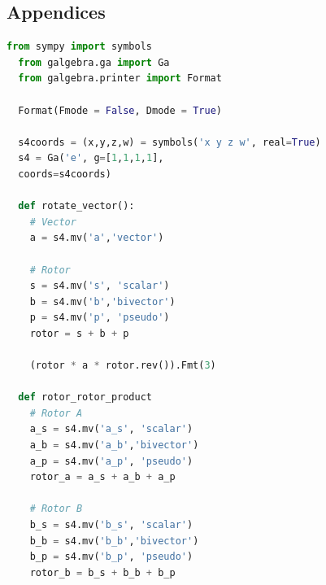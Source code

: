 \documentclass{l4proj}
\begin{document}
\begin{appendices}

\chapter{Appendices}


\begin{lstlisting}[language=python, caption={
  Rotor4 product derivation using Geometric Algebra in python: \\
  Rotor4-Vector rotation using double reflection; producing Equation \ref{eq:rotate_vec}.\\
  Rotor4-Rotor4 product to apply a 4D Rotor to another 4D Rotor; producing Equation \ref{eq:rotate_rotor}.
  }, label=lst:rotor_derivation]
  from sympy import symbols
  from galgebra.ga import Ga
  from galgebra.printer import Format
  
  Format(Fmode = False, Dmode = True)
  
  s4coords = (x,y,z,w) = symbols('x y z w', real=True)
  s4 = Ga('e', g=[1,1,1,1],
  coords=s4coords)
  
  def rotate_vector():
    # Vector
    a = s4.mv('a','vector')

    # Rotor
    s = s4.mv('s', 'scalar')
    b = s4.mv('b','bivector')
    p = s4.mv('p', 'pseudo')
    rotor = s + b + p
  
    (rotor * a * rotor.rev()).Fmt(3)
  
  def rotor_rotor_product
    # Rotor A
    a_s = s4.mv('a_s', 'scalar')
    a_b = s4.mv('a_b','bivector')
    a_p = s4.mv('a_p', 'pseudo')
    rotor_a = a_s + a_b + a_p
  
    # Rotor B
    b_s = s4.mv('b_s', 'scalar')
    b_b = s4.mv('b_b','bivector')
    b_p = s4.mv('b_p', 'pseudo')
    rotor_b = b_s + b_b + b_p
  

\end{lstlisting}
\end{appendices}
\end{document}
